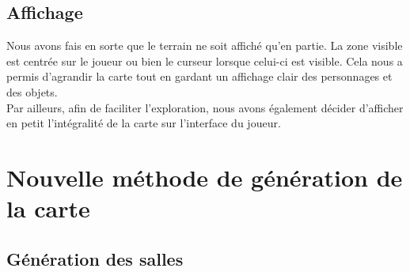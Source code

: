 \documentclass[10pt,a4paper]{article}
\begin{document}
\subsection{Affichage}
Nous avons fais en sorte que le terrain ne soit affiché qu'en partie. La zone visible est centrée sur le joueur ou bien le curseur lorsque celui-ci est visible. Cela nous a permis d'agrandir la carte tout en gardant un affichage clair des personnages et des objets.\\
Par ailleurs, afin de faciliter l'exploration, nous avons également décider d'afficher en petit l'intégralité de la carte sur l'interface du joueur.


\section{Nouvelle méthode de génération de la carte}
\subsection{Génération des salles}
\end{document}
